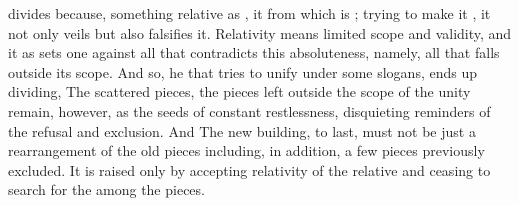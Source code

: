 \pa {} divides because,  something relative as
, it  from  which is ; trying to
make it , it not only veils but also falsifies it.  Relativity means
limited scope and validity, and  it as  sets one
against all that contradicts this absoluteness, namely, all that falls outside
its scope.  And so, he that tries to unify under some  slogans,
ends up dividing,  The scattered pieces, the pieces left outside
the scope of the  unity remain, however, as the seeds of constant
restlessness, disquieting reminders of the refusal and exclusion.  And
 The new building, to last, must not be just a
rearrangement of the old pieces including, in addition, a few pieces previously
excluded. It is raised only by accepting relativity of the relative and ceasing
to search for the  among the  pieces.
      

